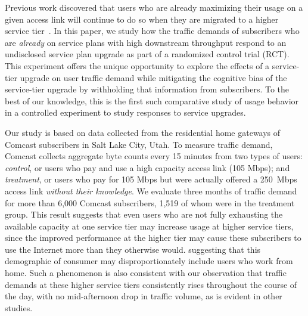 
Previous work discovered that users who are already maximizing their
usage on a given access link will continue to do so when they are
migrated to a higher service tier~\cite{dasu-imc2014}. In this paper, we
study how the traffic demands of subscribers who are {\em already} on service
plans with high downstream throughput respond to an undisclosed service
plan upgrade as part of a randomized control trial (RCT). This
experiment offers the unique opportunity to explore the effects of a
service-tier upgrade on user traffic demand while mitigating the
cognitive bias of the service-tier upgrade by withholding that
information from subscribers. To the best of our knowledge, this is the
first such comparative study of usage behavior in a controlled
experiment to study responses to service upgrades.

Our study is based on data collected from the residential home gateways
of Comcast subscribers in Salt Lake City, Utah. To measure traffic
demand, Comcast collects aggregate byte counts every 15 minutes from two
types of users: {\em control}, or users who pay and use a high capacity
access link (105 Mbps); and {\em treatment}, or users who pay for 105
Mbps but were actually offered a 250~Mbps access link {\em without their
  knowledge}.  We evaluate three months of traffic demand for more than
6,000 Comcast subscribers, 1,519 of whom were in the treatment group.
 This result suggests that
 even users who are not fully exhausting the available capacity at
one service tier may increase usage at higher service tiers, since the
improved performance at the higher tier may cause these subscribers to
use the Internet more than they otherwise would. 
suggesting that this demographic of consumer may disproportionately
include users who work from home.  Such a phenomenon is also consistent
with our observation that traffic demands at these higher service
tiers consistently rises throughout the course of the day, with no
mid-afternoon drop in traffic volume, as is evident in other studies.


